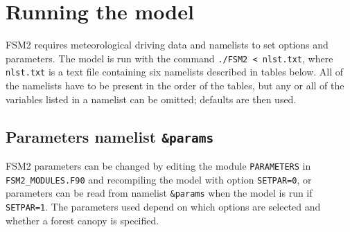\documentclass{article}
\begin{document}
\section{Running the model}

FSM2 requires meteorological driving data and namelists to set options and parameters. The model is run with the command {\tt ./FSM2 < nlst.txt}, where {\tt nlst.txt} is a text file containing six namelists described in tables below. All of the namelists have to be present in the order of the tables, but any or all of the variables listed in a namelist can be omitted; defaults are then used.

\subsection{Parameters namelist {\tt \&params}}

FSM2 parameters can be changed by editing the module {\tt PARAMETERS} in {\tt FSM2\_MODULES.F90} and recompiling the model with option {\tt SETPAR=0}, or parameters can be read from namelist {\tt \&params} when the model is run if {\tt SETPAR=1}. The parameters used depend on which options are selected and whether a forest canopy is specified.
\end{document}
